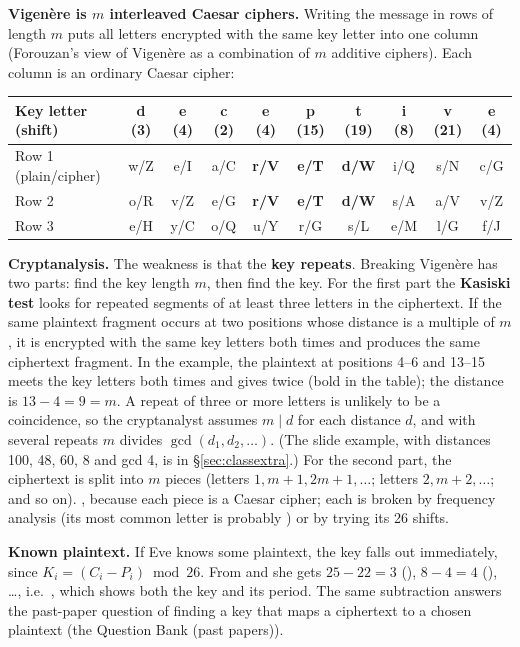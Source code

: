 \textbf{Vigen\`ere is $m$ interleaved Caesar ciphers.} Writing the message in rows of length $m$ puts all letters encrypted with the same key letter into one column (Forouzan's view of Vigen\`ere as a combination of $m$ additive ciphers). Each column is an ordinary Caesar cipher:
\begin{center}\small\setlength{\tabcolsep}{4pt}
\begin{tabular}{@{}l*{9}{c}@{}}
\toprule
Key letter (shift) & d (3) & e (4) & c (2) & e (4) & p (15) & t (19) & i (8) & v (21) & e (4)\\
\midrule
Row 1 (plain/cipher) & w/Z & e/I & a/C & \textbf{r/V} & \textbf{e/T} & \textbf{d/W} & i/Q & s/N & c/G\\
Row 2 & o/R & v/Z & e/G & \textbf{r/V} & \textbf{e/T} & \textbf{d/W} & s/A & a/V & v/Z\\
Row 3 & e/H & y/C & o/Q & u/Y & r/G & s/L & e/M & l/G & f/J\\
\bottomrule
\end{tabular}
\end{center}

\textbf{Cryptanalysis.} The weakness is that the \textbf{key repeats}. Breaking Vigen\`ere has two parts: find the key length $m$, then find the key. For the first part the \textbf{Kasiski test} looks for repeated segments of at least three letters in the ciphertext. If the same plaintext fragment occurs at two positions whose distance is a multiple of $m$, it is encrypted with the same key letters both times and produces the same ciphertext fragment. In the example, the plaintext  at positions 4--6 and 13--15 meets the key letters  both times and gives  twice (bold in the table); the distance is $13 - 4 = 9 = m$. A repeat of three or more letters is unlikely to be a coincidence, so the cryptanalyst assumes $m \mid d$ for each distance $d$, and with several repeats $m$ divides $\gcd(d_1, d_2, \dots)$. (The slide example, with distances 100, 48, 60, 8 and gcd 4, is in \S\ref{sec:classextra}.) For the second part, the ciphertext is split into $m$ pieces (letters $1, m{+}1, 2m{+}1, \dots$; letters $2, m{+}2, \dots$; and so on). , because each piece is a Caesar cipher; each is broken by frequency analysis (its most common letter is probably ) or by trying its 26 shifts.

\textbf{Known plaintext.} If Eve knows some plaintext, the key falls out immediately, since $K_i = (C_i - P_i) \bmod 26$. From  and  she gets $25 - 22 = 3$ (), $8 - 4 = 4$ (), \dots, i.e.\ , which shows both the key and its period. The same subtraction answers the past-paper question of finding a key that maps a ciphertext to a chosen plaintext (the Question Bank (past papers)).


